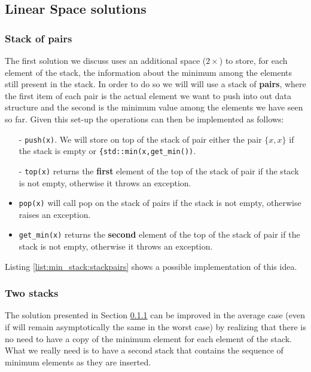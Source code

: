 \subsection{Linear Space solutions}
\label{min_stack:sec:double_stack}

\subsubsection{Stack of pairs}
\label{min_stack:sec:stackpairs}
The first solution we discuss uses an additional space ($2\times$) to store, for each element of the stack, the information about the minimum among the elements still present in the stack. In order to do so we will will use a stack of \textbf{pairs}, where the first item of each pair is the actual element we want to push into out data structure and the second is the minimum value among the elements we have seen so far. Given this set-up the operations can then be implemented as follows:

\begin{itemize}
	\item[-]\lstinline[columns=fixed]{push(x)}. We will store on top of the stack of pair either the pair $\{x,x\}$ if the stack is empty or \lstinline[columns=fixed]{{std::min(x,get_min())}.
	\item[-]\lstinline[columns=fixed]{top(x)}  returns the \textbf{first} element of the top of the stack of pair if the stack is not empty, otherwise it throws an exception.
	\item[-]\lstinline[columns=fixed]{pop(x)} will call pop on the stack of pairs if the stack is not empty, otherwise raises an exception.
	\item[-]\lstinline[columns=fixed]{get_min(x)}  returns the \textbf{second} element of the top of the stack of pair if the stack is not empty, otherwise it throws an exception.
\end{itemize}

Listing \ref{list:min_stack:stackpairs} shows a possible implementation of this idea.


\subsubsection{Two stacks}
\label{min_stack:sec:twostacks}
The solution presented in Section \ref{min_stack:sec:stackpairs} can be improved in the average case (even if will remain asymptotically the same in the worst case) by realizing that there is no need to have a copy of the minimum element for each element of the stack. What we really need is to have a second stack that contains the sequence of minimum elements as they are inserted. 

